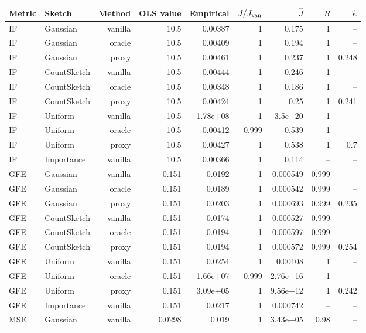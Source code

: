 \begin{table}[t]
\centering
\small
\begin{tabular}{llrrrrrrr}
\toprule
Metric & Sketch & Method & OLS value & Empirical & $J/J_{\rm van}$ & $\hat J$ & $R$ & $\hat\kappa$ \\
\midrule
IF & Gaussian & vanilla & 10.5 & 0.00387 & 1 & 0.175 & 1 & -- \\
IF & Gaussian & oracle & 10.5 & 0.00409 & 1 & 0.194 & 1 & -- \\
IF & Gaussian & proxy & 10.5 & 0.00461 & 1 & 0.237 & 1 & 0.248 \\
IF & CountSketch & vanilla & 10.5 & 0.00444 & 1 & 0.246 & 1 & -- \\
IF & CountSketch & oracle & 10.5 & 0.00348 & 1 & 0.186 & 1 & -- \\
IF & CountSketch & proxy & 10.5 & 0.00424 & 1 & 0.25 & 1 & 0.241 \\
IF & Uniform & vanilla & 10.5 & 1.78e+08 & 1 & 3.5e+20 & 1 & -- \\
IF & Uniform & oracle & 10.5 & 0.00412 & 0.999 & 0.539 & 1 & -- \\
IF & Uniform & proxy & 10.5 & 0.00427 & 1 & 0.538 & 1 & 0.7 \\
IF & Importance & vanilla & 10.5 & 0.00366 & 1 & 0.114 & -- & -- \\
\midrule
GFE & Gaussian & vanilla & 0.151 & 0.0192 & 1 & 0.000549 & 0.999 & -- \\
GFE & Gaussian & oracle & 0.151 & 0.0189 & 1 & 0.000542 & 0.999 & -- \\
GFE & Gaussian & proxy & 0.151 & 0.0203 & 1 & 0.000693 & 0.999 & 0.235 \\
GFE & CountSketch & vanilla & 0.151 & 0.0174 & 1 & 0.000527 & 0.999 & -- \\
GFE & CountSketch & oracle & 0.151 & 0.0194 & 1 & 0.000597 & 0.999 & -- \\
GFE & CountSketch & proxy & 0.151 & 0.0194 & 1 & 0.000572 & 0.999 & 0.254 \\
GFE & Uniform & vanilla & 0.151 & 0.0254 & 1 & 0.00108 & 1 & -- \\
GFE & Uniform & oracle & 0.151 & 1.66e+07 & 0.999 & 2.76e+16 & 1 & -- \\
GFE & Uniform & proxy & 0.151 & 3.09e+05 & 1 & 9.56e+12 & 1 & 0.242 \\
GFE & Importance & vanilla & 0.151 & 0.0217 & 1 & 0.000742 & -- & -- \\
\midrule
MSE & Gaussian & vanilla & 0.0298 & 0.019 & 1 & 3.43e+05 & 0.98 & -- \\

\end{tabular}
\end{table}
